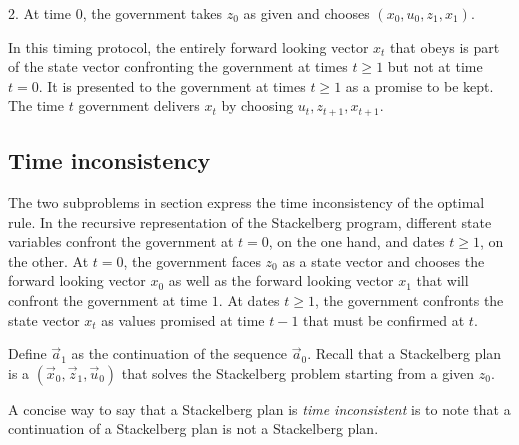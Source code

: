 \medskip

\item{2.} At time $0$,  the government takes $z_0$ as given and chooses $(x_0, u_0, z_1, x_1)$.

\smallskip
\noindent In this timing protocol, the entirely  forward looking vector $x_t$ that obeys  is part of the  state vector confronting
the government at times $t \geq 1$ but not at time $t=0$.  It is  presented to the government
at times $t \geq 1$ as a promise to be kept.  The time $t$ government delivers $x_t$  by choosing $u_t, z_{t+1}, x_{t+1}$.

\subsection{Time  inconsistency}
The two subproblems in section  express the time inconsistency of the optimal rule. In the recursive representation of
the Stackelberg program, different state variables confront the government at $t=0$, on the one hand, and dates $t \geq 1$, on the other.
At $t =0$, the government faces $z_0$ as a state vector and  chooses the forward looking
vector $x_0$ as well as the forward looking vector $x_1$ that will confront the
government at time $1$.  At dates $t \geq 1$,  the government confronts the state vector $x_t$  as  values promised at time $t-1$ that must
be confirmed at $t$.


Define $\vec a_1$ as the continuation of the sequence $\vec a_0$. Recall that a
 Stackelberg plan is a  $(\vec x_0, \vec z_1, \vec u_0)$ that solves the Stackelberg problem starting from a given $z_0$.

  A concise way
to say that a Stackelberg plan is {\it time inconsistent\/} is to note that a continuation of a Stackelberg plan is not
a Stackelberg plan.
%
%



